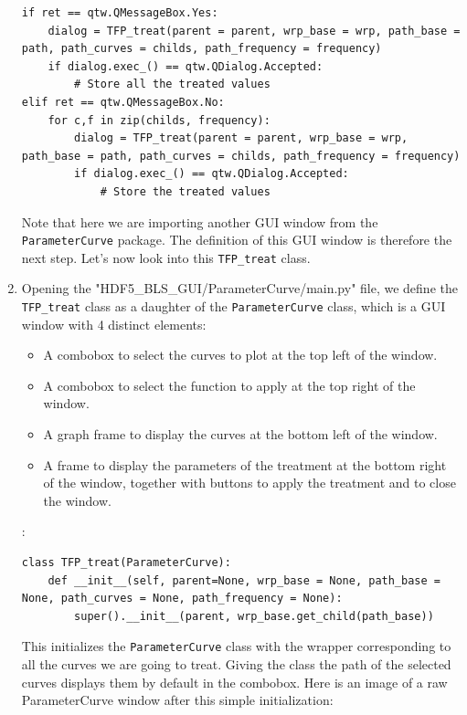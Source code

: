 \documentclass[a4paper,12pt]{article}
\begin{document}
\begin{enumerate}
\begin{lstlisting}
if ret == qtw.QMessageBox.Yes: 
    dialog = TFP_treat(parent = parent, wrp_base = wrp, path_base = path, path_curves = childs, path_frequency = frequency)
    if dialog.exec_() == qtw.QDialog.Accepted:
        # Store all the treated values
elif ret == qtw.QMessageBox.No:
    for c,f in zip(childs, frequency):
        dialog = TFP_treat(parent = parent, wrp_base = wrp, path_base = path, path_curves = childs, path_frequency = frequency)
        if dialog.exec_() == qtw.QDialog.Accepted:
            # Store the treated values
\end{lstlisting}
        Note that here we are importing another GUI window from the \texttt{ParameterCurve} package. The definition of this GUI window is therefore the next step. Let's now look into this \texttt{TFP\_treat} class.
        \item Opening the "HDF5\_BLS\_GUI/ParameterCurve/main.py" file, we define the \texttt{TFP\_treat} class as a daughter of the \texttt{ParameterCurve} class, which is a GUI window with 4 distinct elements:
        \begin{itemize}
            \item A combobox to select the curves to plot at the top left of the window.
            \item A combobox to select the function to apply at the top right of the window.
            \item A graph frame to display the curves at the bottom left of the window.
            \item A frame to display the parameters of the treatment at the bottom right of the window, together with buttons to apply the treatment and to close the window.
        \end{itemize}:
\begin{lstlisting}
class TFP_treat(ParameterCurve):
    def __init__(self, parent=None, wrp_base = None, path_base = None, path_curves = None, path_frequency = None):
        super().__init__(parent, wrp_base.get_child(path_base))
\end{lstlisting}
        This initializes the \texttt{ParameterCurve} class with the wrapper corresponding to all the curves we are going to treat. Giving the class the path of the selected curves displays them by default in the combobox.
        Here is an image of a raw ParameterCurve window after this simple initialization:
        \begin{center}

\end{center}
\end{enumerate}
\end{document}

